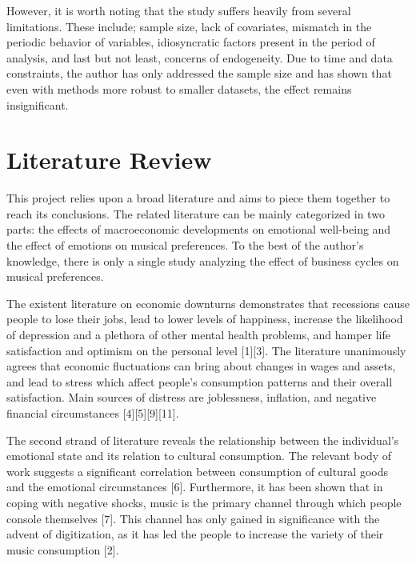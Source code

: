 \documentclass[12pt]{article}
\begin{document}
However, it is worth noting that the study suffers heavily from several limitations. These include; sample size, lack of covariates, mismatch in the periodic behavior of variables, idiosyncratic factors present in the period of analysis, and last but not least, concerns of endogeneity. Due to time and data constraints, the author has only addressed the sample size and has shown that even with methods more robust to smaller datasets, the effect remains insignificant.

\section{Literature Review}

This project relies upon a broad literature and aims to piece them together to reach its conclusions. The related literature can be mainly categorized in two parts: the effects of macroeconomic developments on emotional well-being and the effect of emotions on musical preferences. To the best of the author's knowledge, there is only a single study analyzing the effect of business cycles on musical preferences.

The existent literature on economic downturns demonstrates that recessions cause people to lose their jobs, lead to lower levels of happiness, increase the likelihood of depression and a plethora of other mental health problems, and hamper life satisfaction and optimism on the personal level [1][3]. The literature unanimously agrees that economic fluctuations can bring about changes in wages and assets, and lead to stress which affect people's consumption patterns and their overall satisfaction. Main sources of distress are joblessness, inflation, and negative financial circumstances [4][5][9][11].

The second strand of literature reveals the relationship between the individual's emotional state and its relation to cultural consumption. The relevant body of work suggests a significant correlation between consumption of cultural goods and the emotional circumstances [6]. Furthermore, it has been shown that in coping with negative shocks, music is the primary channel through which people console themselves [7]. This channel has only gained in significance with the advent of digitization, as it has led the people to increase the variety of their music consumption [2].
\end{document}
